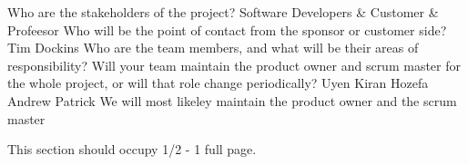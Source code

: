 Who are the stakeholders of the project? 
Software Developers & Customer & Profeesor
Who will be the point of contact from the sponsor or customer side? 
Tim Dockins
Who are the team members, and what will be their areas of responsibility? Will your team maintain the product owner and scrum master for the whole project, or will that role change periodically?
Uyen 
Kiran
Hozefa
Andrew
Patrick
We will most likeley maintain the product owner and the scrum master

This section should occupy 1/2 - 1 full page.